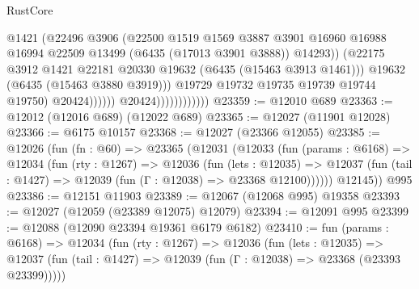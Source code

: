 \begin{lexlean}{RustCore}
\begin{coremodule}
                                            @1421
                                            (@22496
                                              @3906
                                              (@22500
                                                @1519
                                                @1569
                                                @3887
                                                @3901
                                                @16960
                                                @16988
                                                @16994
                                                @22509
                                                @13499
                                                (@6435 (@17013 @3901 @3888))
                                                @14293))
                                            (@22175
                                              @3912
                                              @1421
                                              @22181
                                              @20330
                                              @19632
                                              (@6435 (@15463 @3913 @1461)))
                                            @19632
                                            (@6435 (@15463 @3880 @3919)))
                                          @19729
                                          @19732
                                          @19735
                                          @19739
                                          @19744
                                          @19750)
                                        @20424))))))
                            @20424))))))))))))
@23359 := @12010 @689
@23363 := @12012 (@12016 @689) (@12022 @689)
@23365 := @12027 (@11901 @12028)
@23366 := @6175 @10157
@23368 := @12027 (@23366 @12055)
@23385 := @12026
    (fun (fn : @60) =>
    @23365
      (@12031
        (@12033
          (fun (params : @6168) =>
          @12034
            (fun (rty : @1267) =>
            @12036
              (fun (lets : @12035) =>
              @12037 (fun (tail : @1427) => @12039 (fun (Γ : @12038) => @23368 @12100))))))
        @12145))
    @995
@23386 := @12151 @11903
@23389 := @12067 (@12068 @995) @19358
@23393 := @12027 (@12059 (@23389 @12075) @12079)
@23394 := @12091 @995
@23399 := @12088 (@12090 @23394 @19361 @6179 @6182)
@23410 := fun (params : @6168) =>
  @12034
    (fun (rty : @1267) =>
    @12036
      (fun (lets : @12035) =>
      @12037 (fun (tail : @1427) => @12039 (fun (Γ : @12038) => @23368 (@23393 @23399)))))

\end{coremodule}
\end{lexlean}
